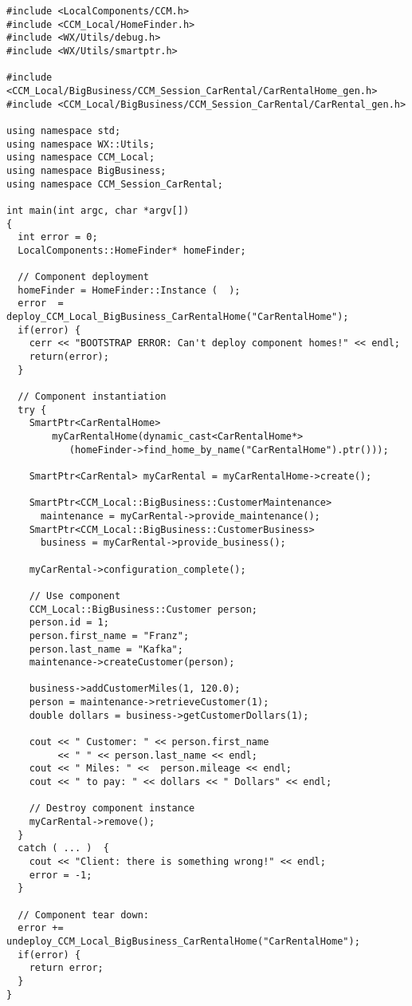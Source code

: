 \begin{small}
\begin{verbatim}
#include <LocalComponents/CCM.h>
#include <CCM_Local/HomeFinder.h>
#include <WX/Utils/debug.h>
#include <WX/Utils/smartptr.h>

#include <CCM_Local/BigBusiness/CCM_Session_CarRental/CarRentalHome_gen.h>
#include <CCM_Local/BigBusiness/CCM_Session_CarRental/CarRental_gen.h>

using namespace std;
using namespace WX::Utils;
using namespace CCM_Local;
using namespace BigBusiness;
using namespace CCM_Session_CarRental;

int main(int argc, char *argv[])
{
  int error = 0;
  LocalComponents::HomeFinder* homeFinder;

  // Component deployment
  homeFinder = HomeFinder::Instance (  );
  error  = deploy_CCM_Local_BigBusiness_CarRentalHome("CarRentalHome");
  if(error) {
    cerr << "BOOTSTRAP ERROR: Can't deploy component homes!" << endl;
    return(error);
  }

  // Component instantiation
  try {
    SmartPtr<CarRentalHome> 
        myCarRentalHome(dynamic_cast<CarRentalHome*>
           (homeFinder->find_home_by_name("CarRentalHome").ptr()));

    SmartPtr<CarRental> myCarRental = myCarRentalHome->create();

    SmartPtr<CCM_Local::BigBusiness::CustomerMaintenance> 
      maintenance = myCarRental->provide_maintenance();    
    SmartPtr<CCM_Local::BigBusiness::CustomerBusiness> 
      business = myCarRental->provide_business();

    myCarRental->configuration_complete();

    // Use component
    CCM_Local::BigBusiness::Customer person;
    person.id = 1;
    person.first_name = "Franz";
    person.last_name = "Kafka";
    maintenance->createCustomer(person);

    business->addCustomerMiles(1, 120.0); 
    person = maintenance->retrieveCustomer(1);
    double dollars = business->getCustomerDollars(1); 

    cout << " Customer: " << person.first_name 
         << " " << person.last_name << endl;
    cout << " Miles: " <<  person.mileage << endl;
    cout << " to pay: " << dollars << " Dollars" << endl;

    // Destroy component instance
    myCarRental->remove();
  } 
  catch ( ... )  {
    cout << "Client: there is something wrong!" << endl;
    error = -1;
  }

  // Component tear down:
  error += undeploy_CCM_Local_BigBusiness_CarRentalHome("CarRentalHome");
  if(error) {
    return error;
  }
}
\end{verbatim}
\end{small}

